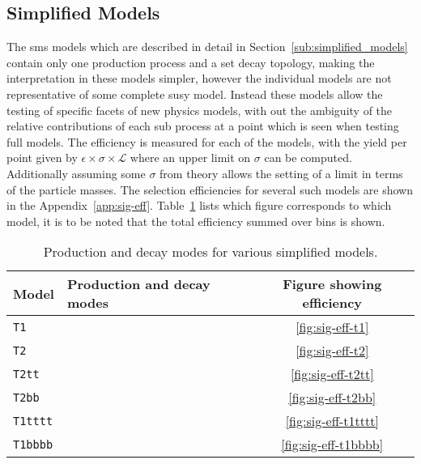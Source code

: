\subsection{Simplified Models} %
\label{par:simplified_models}
The \ac{sms} models which are described in detail in 
Section~\ref{sub:simplified_models} contain only one production process and a 
set decay topology, making the interpretation in these models simpler, however 
the individual models are not representative of some complete \ac{susy} model. 
Instead these models allow the testing of specific facets of new physics 
models, with out the ambiguity of the relative contributions of each sub 
process at a point which is seen when testing full models. The efficiency is 
measured for each of the models, with the yield per point given by 
$\epsilon\times\sigma\times\mathcal{L}$ where an upper limit on $\sigma$ can be 
computed. Additionally assuming some $\sigma$ from theory allows the setting of 
a limit in terms of the particle masses. The selection efficiencies for several 
such models are shown in the Appendix~\ref{app:sig-eff}. 
Table~\ref{tab:sms-eff} lists which figure corresponds to which model, it is to 
be noted that the total efficiency summed over \HT bins is shown.



\begin{table}[h!]
  \caption{Production and decay modes for various simplified models.}
  \label{tab:sms-eff}
  \centering
  \footnotesize
  \begin{tabular}{ llc }
    \hline
    Model & Production and decay modes & Figure showing efficiency \\ [0.5ex]
    \hline
    \texttt{T1} & \HepProcess{\PSgluino\PSgluino\to\Pquark\APquark\PSneutralino\Pquark\APquark\PSneutralino} & \ref{fig:sig-eff-t1} \\
    \texttt{T2} & \HepProcess{\Psquark\Psquark\to\Pquark\PSneutralino\APquark\PSneutralino} & \ref{fig:sig-eff-t2} \\
    \texttt{T2tt} & \HepProcess{\PStop\PStop\to\Ptop\PSneutralino\APtop\PSneutralino}
& \ref{fig:sig-eff-t2tt} \\
    \texttt{T2bb} & \HepProcess{\PSbottom\PSbottom\to\Pbottom\PSneutralino\APbottom\PSneutralino} & \ref{fig:sig-eff-t2bb} \\
    \texttt{T1tttt} & \HepProcess{\PSgluino\PSgluino\to\Ptop\APtop\PSneutralino\Ptop\APtop\PSneutralino} & \ref{fig:sig-eff-t1tttt} \\
    \texttt{T1bbbb} & \HepProcess{\PSgluino\PSgluino\to\Pbottom\APbottom\PSneutralino\Pbottom\APbottom\PSneutralino} & \ref{fig:sig-eff-t1bbbb} \\
    \hline
  \end{tabular}
\end{table}



